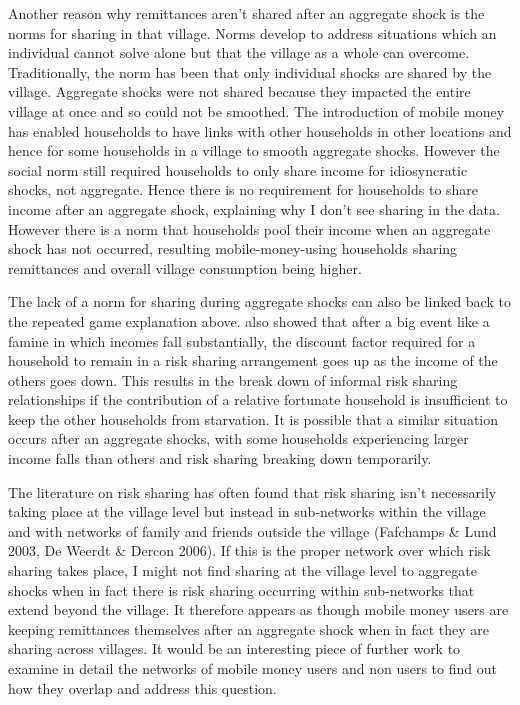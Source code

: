 Another reason why remittances aren't shared after an aggregate shock is the norms for sharing in that village. Norms develop to address situations which an individual cannot solve alone but that the village as a whole can overcome. Traditionally, the norm has been that only individual shocks are shared by the village. Aggregate shocks were not shared because they impacted the entire village at once and so could not be smoothed. The introduction of mobile money has enabled households to have links with other households in other locations and hence for some households in a village to smooth aggregate shocks. However the social norm still required households to only share income for idiosyncratic shocks, not aggregate. Hence there is no requirement for households to share income after an aggregate shock, explaining why I don't see sharing in the data. However there is a norm that households pool their income when an aggregate shock has not occurred, resulting mobile-money-using households sharing remittances and overall village consumption being higher.

The lack of a norm for sharing during aggregate shocks can also be linked back to the repeated game explanation above. \cite{coate1993} also showed that after a big event like a famine in which incomes fall substantially, the discount factor required for a household to remain in a risk sharing arrangement goes up as the income of the others goes down. This results in the break down of informal risk sharing relationships if the contribution of a relative fortunate household is insufficient to keep the other households from starvation. It is possible that a similar situation occurs after an aggregate shocks, with some households experiencing larger income falls than others and risk sharing breaking down temporarily.     
 
The literature on risk sharing has often found that risk sharing isn't necessarily taking place at the village level but instead in sub-networks within the village and with networks of family and friends outside the village (Fafchamps \& Lund 2003, De Weerdt \& Dercon 2006). If this is the proper network over which risk sharing takes place, I might not find sharing at the village level to aggregate shocks when in fact there is risk sharing occurring within sub-networks that extend beyond the village. It therefore appears as though mobile money users are keeping remittances themselves after an aggregate shock when in fact they are sharing across villages. It would be an interesting piece of further work to examine in detail the networks of mobile money users and non users to find out how they overlap and address this question. 

